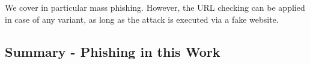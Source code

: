 We cover in particular mass phishing. However, the URL checking can be applied in case of any variant, as long as the attack is executed via a fake website.
\subsection{Summary - Phishing in this Work }
\label{s:summary_phishing}


